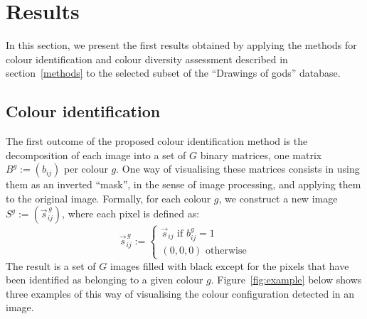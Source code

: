 \documentclass[11pt,a4paper]{article}
\begin{document}
\section{Results}
\label{sec:results}

In this section, we present the first results obtained by applying the methods for colour identification and colour diversity assessment described in section~\ref{methods} to the selected subset of the ``Drawings of gods'' database.

\subsection{Colour identification}
\label{sec:results_identification}

The first outcome of the proposed colour identification method is the decomposition of each image into a set of $G$ binary matrices, one matrix $B^g := (b_{ij})$ per colour $g$. One way of visualising these matrices consists in using them as an inverted ``mask'', in the sense of image processing, and applying them to the original image. Formally, for each colour $g$, we construct a new image $S^g := (\vec{s}^{\,g}_{ij})$, where each pixel is defined as:
\begin{equation}
	\vec{s}^{\,g}_{ij} := 
	\begin{cases} 
		\vec{s}_{ij} \mbox{ if } b^g_{ij} = 1 \\
		(0, 0, 0) \mbox{ otherwise} 
	\end{cases}
\end{equation}
The result is a set of $G$ images filled with black except for the pixels that have been identified as belonging to a given colour $g$. Figure~\ref{fig:example} below shows three examples of this way of visualising the colour configuration detected in an image.
\end{document}
